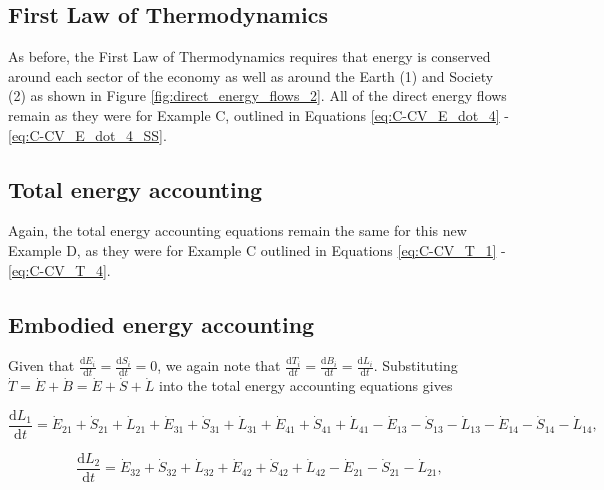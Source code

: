 \documentclass[authoryear,preprint,review,12pt]{elsarticle}
\begin{document}
\subsection{First Law of Thermodynamics}

As before, the First Law of Thermodynamics requires that energy is conserved around each sector of the economy as well as around the Earth (1) and Society (2) as shown in Figure \ref{fig:direct_energy_flows_2}. All of the direct energy flows remain as they were for Example C, outlined in Equations \ref{eq:C-CV_E_dot_4} - \ref{eq:C-CV_E_dot_4_SS}.

\subsection{Total energy accounting}

Again, the total energy accounting equations remain the same for this new Example D, as they were for Example C outlined in Equations \ref{eq:C-CV_T_1} - \ref{eq:C-CV_T_4}.

\subsection{Embodied energy accounting}

Given that $\frac{\mathrm{d}E_{i}}{\mathrm{d}t} = \frac{\mathrm{d}S_{i}}{\mathrm{d}t} = 0$, we again note that $\frac{\mathrm{d}T_i}{\mathrm{d}t} = \frac{\mathrm{d}B_i}{\mathrm{d}t} = \frac{\mathrm{d}L_{i}}{\mathrm{d}t}$. Substituting $\dot{T} = \dot{E} + \dot{B} = \dot{E} + \dot{S} + \dot{L}$ into the total energy accounting equations gives

\begin{equation} \label{eq:D-CV_dB_1}
	\frac{\mathrm{d}L_{1}}{\mathrm{d}t} 	 = \dot{E}_{21} + \dot{S}_{21} + \dot{L}_{21}+ \dot{E}_{31} + \dot{S}_{31} + \dot{L}_{31} + \dot{E}_{41} + \dot{S}_{41} + \dot{L}_{41} - \dot{E}_{13} - \dot{S}_{13} - \dot{L}_{13} - \dot{E}_{14} - \dot{S}_{14} - \dot{L}_{14},
\end{equation}

\begin{equation} \label{eq:D-CV_dB_2}
	\frac{\mathrm{d}L_{2}}{\mathrm{d}t} 	 = \dot{E}_{32} + \dot{S}_{32} + \dot{L}_{32} + \dot{E}_{42} + \dot{S}_{42} + \dot{L}_{42} - \dot{E}_{21} - \dot{S}_{21} - \dot{L}_{21},
\end{equation}
\end{document}
